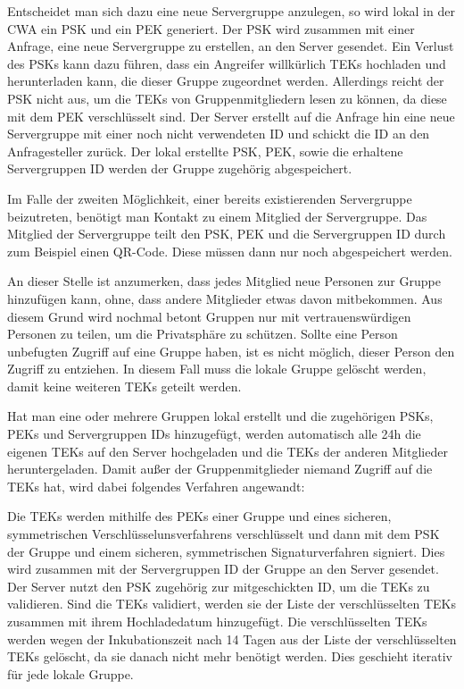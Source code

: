 \documentclass[conference,compsoc]{IEEEtran}
\begin{document}
Entscheidet man sich dazu eine neue Servergruppe anzulegen, so wird lokal in der CWA ein PSK und ein PEK generiert.
Der PSK wird zusammen mit einer Anfrage, eine neue Servergruppe zu erstellen, an den Server gesendet.
Ein Verlust des PSKs kann dazu führen, dass ein Angreifer willkürlich TEKs hochladen und herunterladen kann, die dieser Gruppe zugeordnet werden.
Allerdings reicht der PSK nicht aus, um die TEKs von Gruppenmitgliedern lesen zu können, da diese mit dem PEK verschlüsselt sind.
Der Server erstellt auf die Anfrage hin eine neue Servergruppe mit einer noch nicht verwendeten ID und schickt die ID an den Anfragesteller zurück.
Der lokal erstellte PSK, PEK, sowie die erhaltene Servergruppen ID werden der Gruppe zugehörig abgespeichert.

Im Falle der zweiten Möglichkeit, einer bereits existierenden Servergruppe beizutreten, benötigt man Kontakt zu einem Mitglied der Servergruppe.
Das Mitglied der Servergruppe teilt den PSK, PEK und die Servergruppen ID durch zum Beispiel einen QR-Code.
Diese müssen dann nur noch abgespeichert werden.

An dieser Stelle ist anzumerken, dass jedes Mitglied neue Personen zur Gruppe hinzufügen kann, ohne, dass andere Mitglieder etwas davon mitbekommen.
Aus diesem Grund wird nochmal betont Gruppen nur mit vertrauenswürdigen Personen zu teilen, um die Privatsphäre zu schützen.
Sollte eine Person unbefugten Zugriff auf eine Gruppe haben, ist es nicht möglich, dieser Person den Zugriff zu entziehen.
In diesem Fall muss die lokale Gruppe gelöscht werden, damit keine weiteren TEKs geteilt werden.

Hat man eine oder mehrere Gruppen lokal erstellt und die zugehörigen PSKs, PEKs und Servergruppen IDs hinzugefügt, 
werden automatisch alle 24h die eigenen TEKs auf den Server hochgeladen und die TEKs der anderen Mitglieder heruntergeladen.
Damit außer der Gruppenmitglieder niemand Zugriff auf die TEKs hat, wird dabei folgendes Verfahren angewandt:

Die TEKs werden mithilfe des PEKs einer Gruppe und eines sicheren, symmetrischen Verschlüsselunsverfahrens verschlüsselt und 
dann mit dem PSK der Gruppe und einem sicheren, symmetrischen Signaturverfahren signiert.
Dies wird zusammen mit der Servergruppen ID der Gruppe an den Server gesendet.
Der Server nutzt den PSK zugehörig zur mitgeschickten ID, um die TEKs zu validieren.
Sind die TEKs validiert, werden sie der Liste der verschlüsselten TEKs zusammen mit ihrem Hochladedatum hinzugefügt.
Die verschlüsselten TEKs werden wegen der Inkubationszeit nach 14 Tagen aus der Liste der verschlüsselten TEKs gelöscht, da sie danach nicht mehr benötigt werden.
Dies geschieht iterativ für jede lokale Gruppe.
\end{document}
